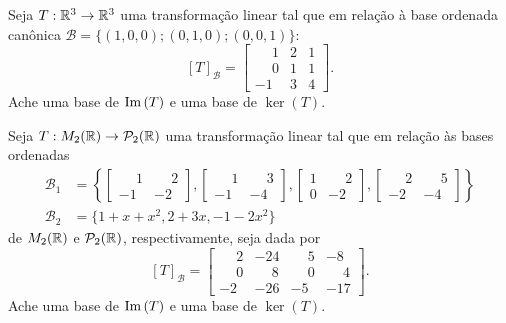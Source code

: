 \documentclass[12pt]{exam}
\begin{document}
\begin{exercicio}
    Seja $T : \mathbb{R}^3 \to \mathbb{R}^3$ uma transformação linear tal que em relação à base ordenada canônica $\mathcal{B} = \{(1,0,0); (0,1,0); (0,0,1)\}$:
    \[
    [T]_\mathcal{B} =\begin{bmatrix}
        \phantom{-}1 & 2 & 1\\
        \phantom{-} 0 & 1 & 1\\
        -1 & 3 & 4
    \end{bmatrix}.
    \]
    Ache uma base de ${\rm Im\,}(T)$ e uma base de $\ker(T)$.
\end{exercicio}

\begin{exercicio}
    Seja $T : M_2(\mathbb{R}) \to \mathcal{P}_2(\mathbb{R})$ uma transformação linear tal que em relação às bases ordenadas
    \begin{align*}
        \mathcal{B}_1 &= \left\{\begin{bmatrix}
            \phantom{-}1 & \phantom{-}2\\-1 & -2
        \end{bmatrix}, \begin{bmatrix}
            \phantom{-}1 & \phantom{-}3\\-1 & -4
        \end{bmatrix}, \begin{bmatrix}
            1 & \phantom{-}2\\0 & -2
        \end{bmatrix}, \begin{bmatrix}
            \phantom{-}2 & \phantom{-}5\\-2 & -4
        \end{bmatrix}\right\}\\
        \mathcal{B}_2 &= \{1 + x + x^2, 2 + 3x, -1 - 2x^2\}
    \end{align*}
    de $M_2(\mathbb{R})$ e $\mathcal{P}_2(\mathbb{R})$, respectivamente, seja dada por
    \[
    [T]_\mathcal{B} =\begin{bmatrix}
        \phantom{-}2 & -24 & \phantom{-}5 & -8\\
        \phantom{-}0 & \phantom{-}8 & \phantom{-}0 & \phantom{-}4\\
        -2 & -26 & -5 & -17
    \end{bmatrix}.
    \]
    Ache uma base de ${\rm Im\,}(T)$ e uma base de $\ker(T)$.
\end{exercicio}
\end{document}
